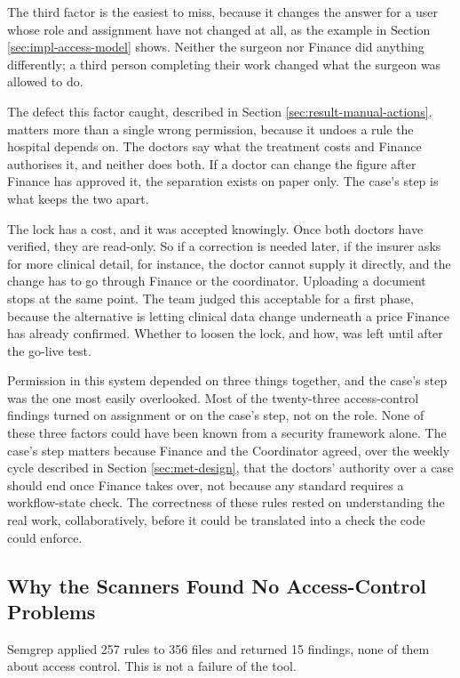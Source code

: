 The third factor is the easiest to miss, because it changes the answer for a user whose role and assignment have not changed at all, as the example in Section \ref{sec:impl-access-model} shows. Neither the surgeon nor Finance did anything differently; a third person completing their work changed what the surgeon was allowed to do.

The defect this factor caught, described in Section \ref{sec:result-manual-actions}, matters more than a single wrong permission, because it undoes a rule the hospital depends on. The doctors say what the treatment costs and Finance authorises it, and neither does both. If a doctor can change the figure after Finance has approved it, the separation exists on paper only. The case's step is what keeps the two apart.

The lock has a cost, and it was accepted knowingly. Once both doctors have verified, they are read-only. So if a correction is needed later, if the insurer asks for more clinical detail, for instance, the doctor cannot supply it directly, and the change has to go through Finance or the coordinator. Uploading a document stops at the same point. The team judged this acceptable for a first phase, because the alternative is letting clinical data change underneath a price Finance has already confirmed. Whether to loosen the lock, and how, was left until after the go-live test.

Permission in this system depended on three things together, and the case's step was the one most easily overlooked. Most of the twenty-three access-control findings turned on assignment or on the case's step, not on the role. None of these three factors could have been known from a security framework alone. The case's step matters because Finance and the Coordinator agreed, over the weekly cycle described in Section \ref{sec:met-design}, that the doctors' authority over a case should end once Finance takes over, not because any standard requires a workflow-state check. The correctness of these rules rested on understanding the real work, collaboratively, before it could be translated into a check the code could enforce.

\subsection{Why the Scanners Found No Access-Control Problems}

Semgrep applied 257 rules to 356 files and returned 15 findings, none of them about access control. This is not a failure of the tool.

